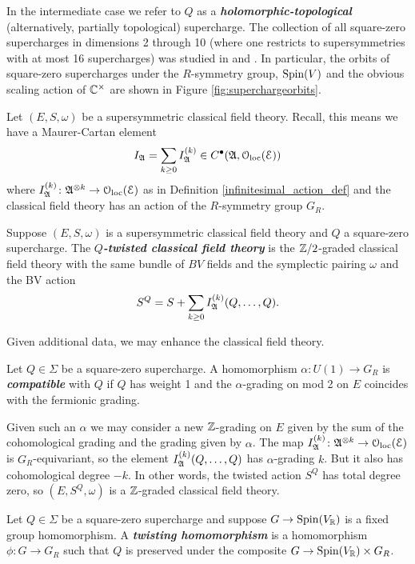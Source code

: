 \documentclass[10pt, oneside]{article}
\newcommand{\defterm}[1]{\textbf{\emph{#1}}}
\begin{document}
In the intermediate case we refer to $Q$ as a \defterm{holomorphic-topological} (alternatively, partially topological) supercharge. The collection of all square-zero supercharges in dimensions 2 through 10 (where one restricts to supersymmetries with at most 16 supercharges) was studied in \cite{ElliottSafronov} and \cite{EagerSaberiWalcher}. In particular, the orbits of square-zero supercharges under the $R$-symmetry group, $\mathrm{Spin}(V)$ and the obvious scaling action of $\mathbb C^\times$ are shown in Figure \ref{fig:superchargeorbits}.

Let $(E, S, \omega)$ be a supersymmetric classical field theory. Recall, this means we have a Maurer-Cartan element 
\[
I_{\mathfrak A} = \sum_{k \geq 0} I_{\mathfrak A}^{(k)} \in C^\bullet(\mathfrak A, \mathcal{O}_{\rm loc}(\mathcal E))
\]
where $I_{\mathfrak A}^{(k)}\colon \mathfrak A^{\otimes k} \to \mathcal{O}_{\rm loc}(\mathcal E)$ as in Definition \ref{infinitesimal_action_def} and the classical field theory has an action of the $R$-symmetry group $G_R$.

\begin{definition} \label{def:twisting}
Suppose $(E, S, \omega)$ is a supersymmetric classical field theory and $Q$ a square-zero supercharge. The \defterm{$Q$-twisted classical field theory} is the $\mathbb Z/2$-graded classical field theory with the same bundle of $BV$ fields and the symplectic pairing $\omega$ and the BV action
\[S^Q = S + \sum_{k \geq 0} I_{\mathfrak A}^{(k)}(Q, \dots, Q).\]
\end{definition}

Given additional data, we may enhance the classical field theory.

\begin{definition}
Let $Q\in\Sigma$ be a square-zero supercharge. A homomorphism $\alpha\colon U(1)\rightarrow G_R$ is \defterm{compatible} with $Q$ if $Q$ has weight 1 and the $\alpha$-grading on mod 2 on $E$ coincides with the fermionic grading.
\end{definition}

Given such an $\alpha$ we may consider a new $\mathbb Z$-grading on $E$ given by the sum of the cohomological grading and the grading given by $\alpha$. The map $I_{\mathfrak A}^{(k)}\colon \mathfrak A^{\otimes k} \to \mathcal{O}_{\rm loc}(\mathcal E)$ is $G_R$-equivariant, so the element $I_{\mathfrak A}^{(k)}(Q, \dots, Q)$ has $\alpha$-grading $k$. But it also has cohomological degree $-k$. In other words, the twisted action $S^Q$ has total degree zero, so $(E, S^Q, \omega)$ is a $\mathbb Z$-graded classical field theory.

\begin{definition}
Let $Q\in\Sigma$ be a square-zero supercharge and suppose $G\rightarrow \mathrm{Spin}(V_\mathbb R)$ is a fixed group homomorphism. A \defterm{twisting homomorphism} is a homomorphism $\phi\colon G\rightarrow G_R$ such that $Q$ is preserved under the composite $G\rightarrow \mathrm{Spin}(V_\mathbb R)\times G_R$.
\end{definition}
\end{document}
